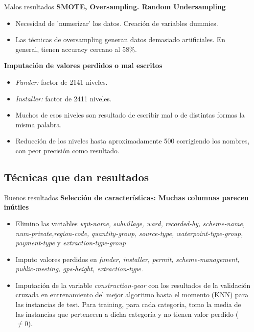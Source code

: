 \begin{frame}{Malos resultados}
	\textbf{SMOTE, Oversampling. Random Undersampling}
	\begin{itemize}
		\item Necesidad de 'numerizar' los datos. Creación de variables dummies. \pause
		\item Las técnicas de oversampling generan datos demasiado artificiales. En general, tienen accuracy cercano al 58\%.
	\end{itemize}
	\textbf{Imputación de valores perdidos o mal escritos} \pause
	\begin{itemize}
		\item \textit{Funder:} factor de 2141 niveles.
		\item \textit{Installer:} factor de 2411 niveles. 
		\item Muchos de esos niveles son resultado de escribir mal o de distintas formas la misma palabra.
		\item Reducción de los niveles hasta aproximadamente 500 corrigiendo los nombres, con peor precisión como resultado.
	\end{itemize}
\end{frame}

\subsection{Técnicas que dan resultados}

\begin{frame}{Buenos resultados}
	\textbf{Selección de características: Muchas columnas parecen inútiles}
	\begin{itemize}
		\item Elimino las variables \textit{wpt-name, subvillage, ward, recorded-by, scheme-name, num-private,region-code, quantity-group, source-type, waterpoint-type-group, payment-type} y \textit{extraction-type-group}
		\item Imputo valores perdidos en \textit{funder, installer, permit, scheme-management, public-meeting, gps-height, extraction-type.}
		\item Imputación de la variable \textit{construction-year} con los resultados de la validación cruzada en entrenamiento del mejor algoritmo hasta el momento (KNN) para las instancias de test. Para training, para cada categoría, tomo la media de las instancias que pertenecen a dicha categoría y no tienen valor perdido ($\neq 0$).
	\end{itemize}
\end{frame}


